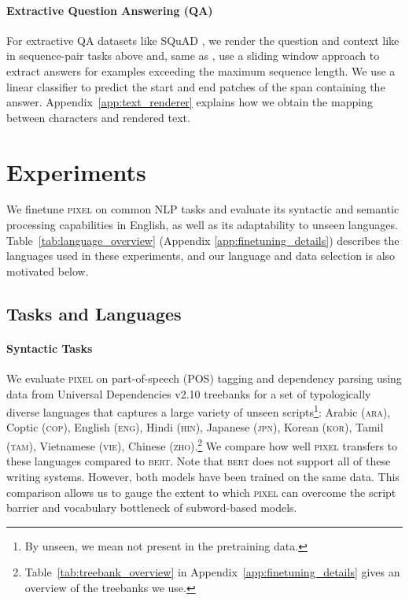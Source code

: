 \documentclass{article}
\newcommand{\model}{\textsc{pixel}\xspace}
\newcommand{\arabi}{\textsc{ara}\xspace}
\newcommand{\english}{\textsc{eng}\xspace}
\newcommand{\coptic}{\textsc{cop}\xspace}
\newcommand{\japanese}{\textsc{jpn}\xspace}
\newcommand{\hindi}{\textsc{hin}\xspace}
\newcommand{\korean}{\textsc{kor}\xspace}
\newcommand{\vietnamese}{\textsc{vie}\xspace}
\newcommand{\chinese}{\textsc{zho}\xspace}
\newcommand{\tamil}{\textsc{tam}\xspace}
\begin{document}
\paragraph{Extractive Question Answering (QA)} For extractive QA datasets like SQuAD \citep{rajpurkar-etal-2016-squad}, we render the question and context like in sequence-pair tasks above and, same as \cite{devlin-etal-2019-bert}, use a sliding window approach to extract answers for examples exceeding the maximum sequence length. We use a linear classifier to predict the start and end patches of the span containing the answer. Appendix~\ref{app:text_renderer} explains how we obtain the mapping between characters and rendered text.

\vspace{-2mm}
\section{Experiments}
\vspace{-2mm}

We finetune \model on common NLP tasks and evaluate its syntactic and semantic processing capabilities in English, as well as its adaptability to unseen languages. Table~\ref{tab:language_overview} (Appendix \ref{app:finetuning_details}) describes the languages used in these experiments, and our language and data selection is also motivated below.

\vspace{-2mm}
\subsection{Tasks and Languages}
\label{sec:tasks_languages}
\vspace{-2mm}

\paragraph{Syntactic Tasks} We evaluate \model on part-of-speech (POS) tagging and dependency parsing using data from Universal Dependencies v2.10 treebanks \citep{nivre-etal-2020-universal, zeman-etal-2022-ud} for a set of typologically diverse languages that captures a large variety of unseen scripts\footnote{By unseen, we mean not present in the pretraining data.}: Arabic (\arabi), Coptic (\coptic), English (\english), Hindi (\hindi), Japanese (\japanese), Korean (\korean), Tamil (\tamil), Vietnamese (\vietnamese), Chinese (\chinese).\footnote{Table~\ref{tab:treebank_overview} in Appendix~\ref{app:finetuning_details} gives an overview of the treebanks we use.}
We compare how well \model{} transfers to these languages compared to \textsc{bert}. Note that \textsc{bert} does not support all of these writing systems. However, both models have been trained on the same data. This comparison allows us to gauge the extent to which \model can overcome the script barrier and vocabulary bottleneck of subword-based models.
\end{document}
